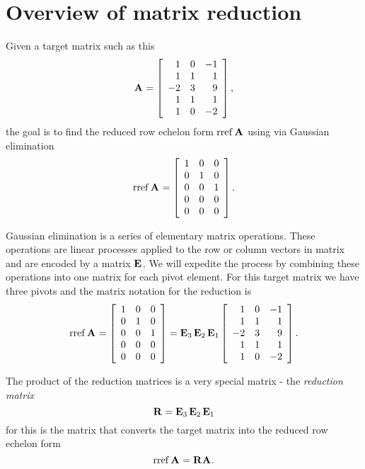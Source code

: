 \section{Overview of matrix reduction}
Given a target matrix such as this
\begin{equation}
\A{} = 
\mat{rrr}
{
  1 & 0 & -1 \\
  1 & 1 & 1 \\
 -2 & 3 & 9 \\
  1 & 1 & 1 \\
  1 & 0 & -2
},
\end{equation}
the goal is to find the reduced row echelon form $\rref \A{}$ using via Gaussian elimination
\begin{equation}
\rref \A{} =
\left[
\begin{array}{ccc}
 1 & 0 & 0 \\
 0 & 1 & 0 \\
 0 & 0 & 1 \\
 0 & 0 & 0 \\
 0 & 0 & 0
\end{array}
\right].
\end{equation}

Gaussian elimination is a series of elementary matrix operations. These operations are linear processes applied to the row or column vectors in matrix and are encoded by a matrix $\E{}$. We will expedite the process by combining these operations into one matrix for each pivot element. For this target matrix we have three pivots and the matrix notation for the reduction is
\begin{equation}
\rref \A{} =
\left[
\begin{array}{ccc}
 1 & 0 & 0 \\
 0 & 1 & 0 \\
 0 & 0 & 1 \\
 0 & 0 & 0 \\
 0 & 0 & 0
\end{array}
\right] = 
\E{3} \, \E{2} \, \E{1}
\mat{rrr}
{
  1 & 0 & -1 \\
  1 & 1 &  1 \\
 -2 & 3 &  9 \\
  1 & 1 &  1 \\
  1 & 0 & -2
}.
\end{equation}

The product of the reduction matrices is a very special matrix - the \textit{reduction matrix}
\begin{equation}
  \R{} = \E{3} \, \E{2} \, \E{1}
\end{equation}
for this is the matrix that converts the target matrix into the reduced row echelon form
\begin{equation}
  \rref \A{} = \R{}\A{}.
\end{equation}


